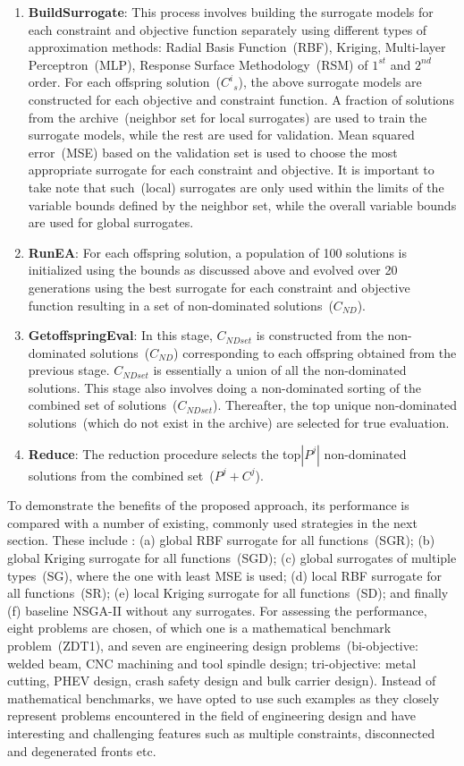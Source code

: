 \begin{enumerate}
	\item \textbf{BuildSurrogate}: This process involves building the surrogate models for each constraint and objective function separately using different types of approximation methods: Radial Basis Function~(RBF), Kriging, Multi-layer Perceptron~(MLP), Response Surface Methodology~(RSM) of $1^{st}$ and $2^{nd}$ order. For each offspring solution~(${C^{i}}_s$), the above surrogate models are constructed for each objective and constraint function. A fraction of solutions from the archive~(neighbor set for local surrogates) are used to train the surrogate models, while the rest are used for validation. Mean squared error~(MSE) based on the validation set is used to choose the most appropriate surrogate for each constraint and objective. It is important to take note that such~(local) surrogates are only used within the limits of the variable bounds defined by the neighbor set, while the overall variable bounds are used for global surrogates.
	\item \textbf{RunEA}: For each offspring solution, a population of 100 solutions is initialized using the bounds as discussed above and evolved over 20 generations using the best surrogate for each constraint and objective function resulting in a set of non-dominated solutions~($C_{ND}$).
	\item \textbf{GetoffspringEval}: In this stage, $C_{NDset}$ is constructed from the non-dominated solutions~($C_{ND}$) corresponding to each offspring obtained from the previous stage. $C_{NDset}$ is essentially a union of all the non-dominated solutions. This stage also involves doing a non-dominated sorting of the combined set of solutions~($C_{NDset}$). Thereafter, the top unique non-dominated solutions~(which do not exist in the archive) are selected for true evaluation.   
	\item \textbf{Reduce}: The reduction procedure selects the top$\left|P^j\right|$ non-dominated solutions from the combined set~($P^j + C^j$).   
\end{enumerate}

To demonstrate the benefits of the proposed approach, its performance is compared with a number of existing, commonly used strategies in the next section. These include :  (a) global RBF surrogate for all functions~(SGR); (b) global Kriging surrogate for all functions~(SGD); (c) global surrogates of multiple types~(SG), where the one with least MSE is used; (d) local RBF surrogate for all functions~(SR); (e) local Kriging surrogate for all functions~(SD); and finally (f) baseline NSGA-II without any surrogates. For assessing the performance, eight problems are chosen, of which one is a mathematical benchmark problem~(ZDT1), and seven are engineering design problems~(bi-objective: welded beam, CNC machining and tool spindle design; tri-objective: metal cutting, PHEV design, crash safety design and bulk carrier design). Instead of mathematical benchmarks, we have opted to use such examples as they closely represent problems encountered in the field of engineering design and have interesting and challenging features such as multiple constraints, disconnected and degenerated fronts etc.

